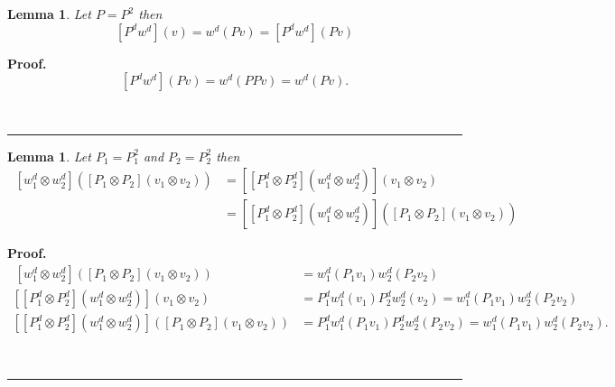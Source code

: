 \documentclass[aps,preprint]{revtex4}%
\newtheorem{lemma}[theorem]{Lemma}
\newenvironment{proof}[1][Proof]{\noindent\textbf{#1.} }{\ \rule{0.5em}{0.5em}}
\begin{document}
\begin{lemma}
Let $P=P^{2}$ then%
\begin{equation}
\left[  P^{d}w^{d}\right]  \left(  v\right)  =w^{d}\left(  Pv\right)  =\left[
P^{d}w^{d}\right]  \left(  Pv\right)
\end{equation}

\end{lemma}

\begin{proof}%
\begin{equation}
\left[  P^{d}w^{d}\right]  \left(  Pv\right)  =w^{d}\left(  PPv\right)
=w^{d}\left(  Pv\right)  .
\end{equation}

\end{proof}

\begin{lemma}
Let $P_{1}=P_{1}^{2}$ and $P_{2}=P_{2}^{2}$ then
\begin{align}
\ \left[  w_{1}^{d}\otimes w_{2}^{d}\right]  \left(  \overset{}{\left[
P_{1}\otimes P_{2}\right]  \left(  v_{1}\otimes v_{2}\right)  }\right)   &
=\left[  \left[  P_{1}^{d}\otimes P_{2}^{d}\right]  \left(  \overset{}{w_{1}%
^{d}\otimes w_{2}^{d}}\right)  \right]  \left(  v_{1}\otimes v_{2}\right) \\
&  =\left[  \overset{}{\left[  P_{1}^{d}\otimes P_{2}^{d}\right]  \left(
\overset{}{w_{1}^{d}\otimes w_{2}^{d}}\right)  }\right]  \left(
\overset{}{\left[  P_{1}\otimes P_{2}\right]  \left(  \overset{}{v_{1}\otimes
v_{2}}\right)  }\right)
\end{align}

\end{lemma}

\begin{proof}%
\begin{align}
\ \left[  w_{1}^{d}\otimes w_{2}^{d}\right]  \left(  \left[  P_{1}\otimes
P_{2}\right]  \left(  v_{1}\otimes v_{2}\right)  \right)   &  =w_{1}%
^{d}\left(  P_{1}v_{1}\right)  w_{2}^{d}\left(  P_{2}v_{2}\right) \\
\left[  \left[  P_{1}^{d}\otimes P_{2}^{d}\right]  \left(  w_{1}^{d}\otimes
w_{2}^{d}\right)  \right]  \left(  v_{1}\otimes v_{2}\right)   &  =P_{1}%
^{d}w_{1}^{d}\left(  v_{1}\right)  P_{2}^{d}w_{2}^{d}\left(  v_{2}\right)
=w_{1}^{d}\left(  P_{1}v_{1}\right)  w_{2}^{d}\left(  P_{2}v_{2}\right) \\
\left[  \left[  P_{1}^{d}\otimes P_{2}^{d}\right]  \left(  w_{1}^{d}\otimes
w_{2}^{d}\right)  \right]  \left(  \left[  P_{1}\otimes P_{2}\right]  \left(
v_{1}\otimes v_{2}\right)  \right)   &  =P_{1}^{d}w_{1}^{d}\left(  P_{1}%
v_{1}\right)  P_{2}^{d}w_{2}^{d}\left(  P_{2}v_{2}\right)  =w_{1}^{d}\left(
P_{1}v_{1}\right)  w_{2}^{d}\left(  P_{2}v_{2}\right)  .
\end{align}

\end{proof}
\end{document}
